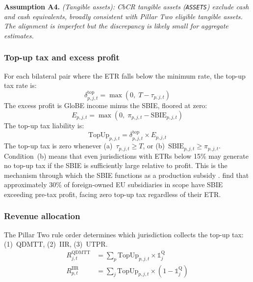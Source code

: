 \documentclass[11pt,a4paper]{article}
\newcommand{\code}[1]{\texttt{#1}}
\newcommand{\assumption}[2]{\noindent\textbf{Assumption #1.} \textit{#2}\medskip}
\begin{document}
\assumption{A4}{(Tangible assets): CbCR tangible assets (\code{ASSETS}) exclude cash and cash equivalents, broadly consistent with Pillar Two eligible tangible assets. The alignment is imperfect but the discrepancy is likely small for aggregate estimates.}

\subsubsection{Top-up tax and excess profit}\label{sec:topup}

For each bilateral pair where the ETR falls below the minimum rate, the top-up tax rate is:
\begin{equation}\label{eq:topup_rate}
\delta_{p,j,t}^{\text{top}} = \max\!\left(0,\; T - \tau_{p,j,t}\right)
\end{equation}
The excess profit is GloBE income minus the SBIE, floored at zero:
\begin{equation}\label{eq:excess}
E_{p,j,t} = \max\!\left(0,\; \pi_{p,j,t} - \text{SBIE}_{p,j,t}\right)
\end{equation}
The top-up tax liability is:
\begin{equation}\label{eq:topup_tax}
\text{TopUp}_{p,j,t} = \delta_{p,j,t}^{\text{top}} \times E_{p,j,t}
\end{equation}
The top-up tax is zero whenever (a)~$\tau_{p,j,t} \geq T$, or (b)~$\text{SBIE}_{p,j,t} \geq \pi_{p,j,t}$. Condition~(b) means that even jurisdictions with ETRs below 15\% may generate no top-up tax if the SBIE is sufficiently large relative to profit. This is the mechanism through which the SBIE functions as a production subsidy \citep{schjelderup2024}. \citet{devereux2023} find that approximately 30\% of foreign-owned EU subsidiaries in scope have SBIE exceeding pre-tax profit, facing zero top-up tax regardless of their ETR.

\subsubsection{Revenue allocation}\label{sec:allocation}

The Pillar Two rule order determines which jurisdiction collects the top-up tax: (1)~QDMTT, (2)~IIR, (3)~UTPR.
\begin{align}
R_{j,t}^{\text{QDMTT}} &= \sum_p \text{TopUp}_{p,j,t} \times \mathbb{1}_j^{\text{Q}} \label{eq:qdmtt} \\
R_{p,t}^{\text{IIR}} &= \sum_j \text{TopUp}_{p,j,t} \times (1 - \mathbb{1}_j^{\text{Q}}) \label{eq:iir}
\end{align}
\end{document}
